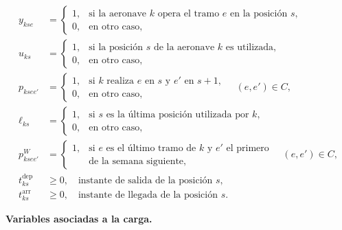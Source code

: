 \begin{align}
y_{kse}
&=
\begin{cases}
1, & \text{si la aeronave $k$ opera el tramo $e$ en la posición $s$},\\
0, & \text{en otro caso},
\end{cases}
\label{var:y}
\\
u_{ks}
&=
\begin{cases}
1, & \text{si la posición $s$ de la aeronave $k$ es utilizada},\\
0, & \text{en otro caso},
\end{cases}
\label{var:u}
\\
p_{ksee'}
&=
\begin{cases}
1, & \text{si $k$ realiza $e$ en $s$ y $e'$ en $s+1$},\\
0, & \text{en otro caso},
\end{cases}
\quad (e,e')\in C,
\label{var:p}
\\
\ell_{ks}
&=
\begin{cases}
1, & \text{si $s$ es la última posición utilizada por $k$},\\
0, & \text{en otro caso},
\end{cases}
\label{var:last}
\\
p^{W}_{ksee'}
&=
\begin{cases}
1, & \text{si $e$ es el último tramo de $k$ y $e'$ el primero}\\
   & \text{de la semana siguiente},
\end{cases}
\quad (e,e')\in C,
\label{var:wrap}
\\
t_{ks}^{\mathrm{dep}}
&\geq0,
\quad
\text{instante de salida de la posición $s$},
\label{var:tdep}
\\
t_{ks}^{\mathrm{arr}}
&\geq0,
\quad
\text{instante de llegada de la posición $s$}.
\label{var:tarr}
\end{align}


\vspace{0.5em}
\noindent\textbf{Variables asociadas a la carga.}

